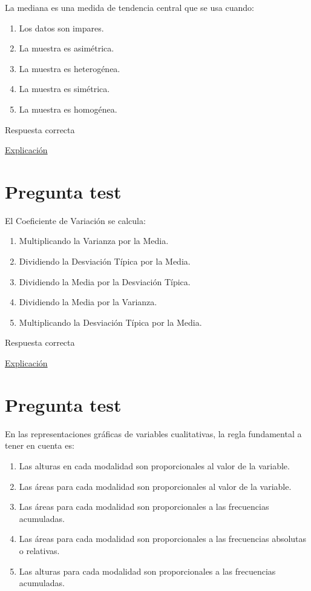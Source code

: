 \documentclass[
]{book}
\providecommand{\tightlist}{%
  \setlength{\itemsep}{0pt}\setlength{\parskip}{0pt}}
\begin{document}
La mediana es una medida de tendencia central que se usa cuando:

\begin{enumerate}
\def\labelenumi{\alph{enumi})}
\tightlist
\item
  Los datos son impares.
\item
  La muestra es asimétrica.
\item
  La muestra es heterogénea.
\item
  La muestra es simétrica.
\item
  La muestra es homogénea.
\end{enumerate}

Respuesta correcta

\href{https://1fjmanzano.github.io/bioestadistica/medidas-de-posicio\%CC\%81n-dispersio\%CC\%81n-y-forma.html\#medidas-de-posicio\%CC\%81n-centrales}{Explicación}

\hypertarget{pregunta-test-54}{%
\section{Pregunta test}\label{pregunta-test-54}}

El Coeficiente de Variación se calcula:

\begin{enumerate}
\def\labelenumi{\alph{enumi})}
\tightlist
\item
  Multiplicando la Varianza por la Media.
\item
  Dividiendo la Desviación Típica por la Media.
\item
  Dividiendo la Media por la Desviación Típica.
\item
  Dividiendo la Media por la Varianza.
\item
  Multiplicando la Desviación Típica por la Media.
\end{enumerate}

Respuesta correcta

\href{https://es.wikipedia.org/wiki/Coeficiente_de_variación}{Explicación}

\hypertarget{pregunta-test-55}{%
\section{Pregunta test}\label{pregunta-test-55}}

En las representaciones gráficas de variables cualitativas, la regla fundamental a tener en cuenta es:

\begin{enumerate}
\def\labelenumi{\alph{enumi})}
\tightlist
\item
  Las alturas en cada modalidad son proporcionales al valor de la variable.
\item
  Las áreas para cada modalidad son proporcionales al valor de la variable.
\item
  Las áreas para cada modalidad son proporcionales a las frecuencias acumuladas.
\item
  Las áreas para cada modalidad son proporcionales a las frecuencias absolutas o relativas.
\item
  Las alturas para cada modalidad son proporcionales a las frecuencias acumuladas.
\end{enumerate}
\end{document}
